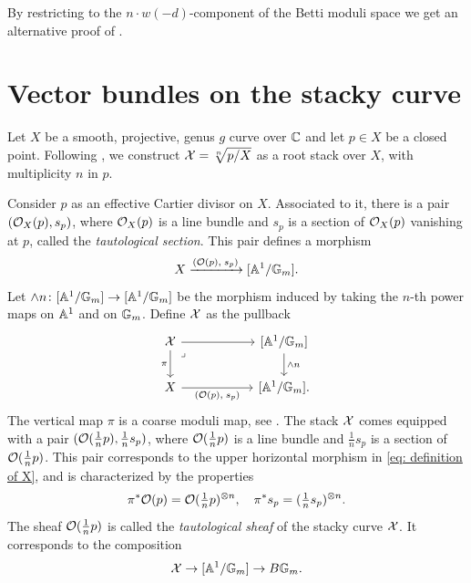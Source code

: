 \documentclass{article}
\begin{document}
By restricting to the $n \cdot w(-d)$-component of the Betti moduli space we get an alternative proof of .

\section{Vector bundles on the stacky curve} \label{section: vector bundles}
Let $X$ be a smooth, projective, genus $g$ curve over $\mathbb{C}$ and let $p \in X$ be a closed point. Following \cite[]{Cadman}, we construct $\mathcal{X} = \sqrt[n]{p/X} $ as a root stack over $X$, with multiplicity $n$ in $p$.

Consider $p$ as an effective Cartier divisor on $X$. Associated to it, there is a pair $(\mathcal{O}_X(p), s_p)$, where $\mathcal{O}_X(p)$ is a line bundle and $s_p$ is a section of $\mathcal{O}_X(p)$ vanishing at $p$, called the \textit{tautological section}. This pair defines a morphism
\[
X \xrightarrow{(\mathcal{O}(p), \; s_p)} [\mathbb{A}^1/\mathbb{G}_m].
\]
Let $\wedge n \colon [\mathbb{A}^1/\mathbb{G}_m] \to [\mathbb{A}^1/\mathbb{G}_m]$ be the morphism induced by taking the $n$-th power maps on $\mathbb{A}^1$ and on $\mathbb{G}_m$. Define $\mathcal{X}$ as the pullback
\begin{equation} \label{eq: definition of X}
\begin{tikzcd}
	\Xc && {[\Ab^1/\Gb_m]} \\
	X & {} & {[\Ab^1/\Gb_m].}
	\arrow[from=1-1, to=1-3]
	\arrow["\pi"', from=1-1, to=2-1]
	\arrow["\lrcorner"{anchor=center, pos=0.125}, draw=none, from=1-1, to=2-2]
	\arrow["{\wedge n}", from=1-3, to=2-3]
	\arrow["{(\O(p), \; s_p)}"', from=2-1, to=2-3]
\end{tikzcd}
\end{equation}
The vertical map $\pi$ is a coarse moduli map, see \cite[Corollary 2.3.7]{Cadman}.
The stack $\mathcal{X}$ comes equipped with a pair $(\mathcal{O}(\frac{1}{n}p), \frac{1}{n}s_p)$, where $\mathcal{O}(\frac{1}{n}p)$ is a line bundle and $\frac{1}{n}s_p$ is a section of $\mathcal{O}(\tfrac{1}{n}p)$. This pair corresponds to the upper horizontal morphism in \eqref{eq: definition of X}, and is characterized by the properties
\begin{equation} \label{eq: pullback of O(p)}
\pi^*\mathcal{O}(p) = \mathcal{O}(\tfrac{1}{n}p)^{\otimes n}, \quad \pi^* s_p = (\tfrac{1}{n}s_p)^{\otimes n}.
\end{equation}
The sheaf $\mathcal{O}(\frac{1}{n}p)$ is called the \textit{tautological sheaf} of the stacky curve $\mathcal{X}$. It corresponds to the composition
\[
\mathcal{X} \to [\mathbb{A}^1 / \mathbb{G}_m] \to B\mathbb{G}_m.
\]
\end{document}
